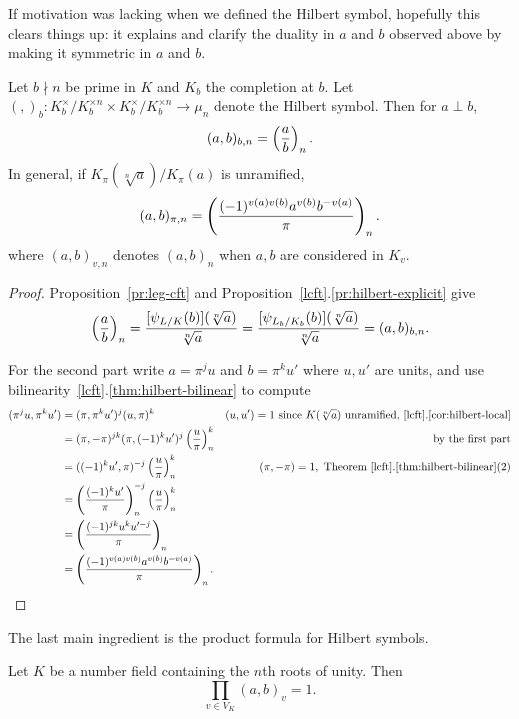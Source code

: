 If motivation was lacking when we defined the Hilbert symbol, hopefully this clears things up: it explains and clarify the duality in $a$ and $b$ observed above by making it symmetric in $a$ and $b$.
\begin{pr}
Let $b\nmid n$ be prime in $K$ and $K_b$ the completion at $b$. 
Let $(,)_b:K_b^{\times}/K_b^{\times n}\times K_b^{\times}/K_b^{\times n}\to \mu_n$ denote the Hilbert symbol. Then for $a\perp b$,
\[
(a,b)_{b,n}=\left( {\frac{a}{b}} \right)_n.
\]
In general, if $K_{\pi}(\sqrt[n] a)/K_{\pi}(a)$ is unramified,  %
\[
(a,b)_{\pi,n}=\left( {\frac{(-1)^{v(a)v(b)}a^{v(b)}b^{-v(a)}}{\pi}} \right)_n.
\]
where $(a,b)_{v,n}$ denotes $(a,b)_n$ when $a,b$ are considered in $K_v$.
\end{pr}
\begin{proof}
Proposition~\ref{pr:leg-cft} and Proposition~\ref{lcft}.\ref{pr:hilbert-explicit} give
\[
\left( {\frac{a}{b}} \right)_n=\frac{[\psi_{L/K}(b)](\sqrt[n]{a})}{\sqrt[n]a}=\frac{[\psi_{L_b/K_b}(b)](\sqrt[n]{a})}{\sqrt[n]a}=(a,b)_{b,n}.
\]

For the second part write $a=\pi^ju$ and $b=\pi^ku'$ where $u,u'$ are units, and use bilinearity~\ref{lcft}.\ref{thm:hilbert-bilinear} to compute
\begin{align*}
(\pi^ju,\pi^ku')&=(\pi, \pi^ku')^j(u,\pi)^k&(u,u')=1\text{ since }K(\sqrt[n]a)\text{ unramified,~\ref{lcft}.\ref{cor:hilbert-local}}\\
&=(\pi,-\pi)^{jk}(\pi, (-1)^ku')^j\left( {\frac{u}{\pi}} \right)_n^k&\text{by the first part}\\
&=((-1)^ku',\pi)^{-j}\left( {\frac{u}{\pi}} \right)_n^k&(\pi,-\pi)=1,\text{ Theorem~\ref{lcft}.\ref{thm:hilbert-bilinear}(2)}\\
&=\left( {\frac{(-1)^ku'}{\pi}} \right)_n^{-j}\left( {\frac{u}{\pi}} \right)_n^k\\
&=\left( {\frac{(-1)^{jk}u^ku'^{-j}}{\pi}} \right)_n\\
&=\left( {\frac{(-1)^{v(a)v(b)}a^{v(b)}b^{-v(a)}}{\pi}} \right)_n.
\end{align*}
\end{proof}
The last main ingredient is the product formula for Hilbert symbols.
\begin{thm}
Let $K$ be a number field containing the $n$th roots of unity. Then
\[
\prod_{v\in V_K} (a,b)_v=1.
\]
\end{thm}
